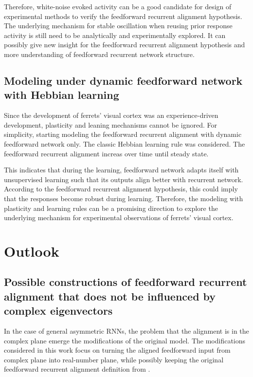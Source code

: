 \documentclass[11pt]{article}
\begin{document}
	Therefore, white-noise evoked activity can be a good candidate for design of experimental methods to verify the feedforward recurrent alignment hypothesis. The underlying mechanism for stable oscillation when reusing prior response activity is still need to be analytically and experimentally explored. It can possibly give new insight for the feedforward recurrent alignment hypothesis and more understanding of feedforward recurrent network structure.
	
	\subsection*{Modeling under dynamic feedforward network with Hebbian learning}
	Since the development of ferrets' visual cortex was an experience-driven development, plasticity and leaning mechanisms cannot be ignored. For simplicity, starting modeling the feedforward recurrent alignment with dynamic feedforward network only. The classic Hebbian learning rule was considered. The feedforward recurrent alignment increas over time until steady state. 
	
	This indicates that during the learning, feedforward network adapts itself with unsupervised learning such that its outputs align better with recurrent network. According to the feedforward recurrent alignment hypothesis, this could imply that the responses become robust during learning. Therefore, the modeling with plasticity and learning rules can be a promising direction to explore the underlying mechanism for experimental observations of ferrets' visual cortex.
	
	\section{Outlook}
	\subsection*{Possible constructions of feedforward recurrent alignment that does not be influenced by complex eigenvectors}
	In the case of general asymmetric RNNs, the problem that the alignment is in the complex plane emerge the modifications of the original model. The modifications considered in this work focus on turning the aligned feedforward input from complex plane into real-number plane, while possibly keeping the original feedforward recurrent alignment definition from \cite{tragenap2023nature}. 
	
\end{document}
